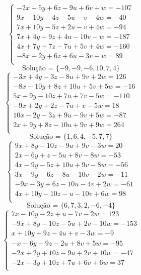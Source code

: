 \documentclass[12pt,oneside,a4paper]{article}
\begin{document}
\vspace{\baselineskip}
\begin{equation*}
\begin{cases}
-2x+5y+6z-9u+6v+w=-107 \\
9x-10y-4z-5u-v-4w=-40 \\
7x+10y-5z+2u-v+4w=-94 \\
7x+4y+9z+4u-10v-w=-187 \\
4x+7y+7z-7u+5v+4w=-160 \\
-8x-2y+6z+6u-3v-w=89 \\
\end{cases}
\end{equation*}
\begin{equation*}
\text{Solução = }\{-9,-9,-6,10,7,4\}
\end{equation*}
\vspace{\baselineskip}
\begin{equation*}
\begin{cases}
-3x+4y-3z-8u+9v+2w=126 \\
-8x-10y+8z+10u+5v+5w=-16 \\
5x-9y-10z+7u+7v-5w=-110 \\
-9x+2y+2z-7u+v-5w=18 \\
10x-2y-3z+9u-9v+5w=-87 \\
2x+9y+8z-10u+9v+9w=264 \\
\end{cases}
\end{equation*}
\begin{equation*}
\text{Solução = }\{1,6,4,-5,7,7\}
\end{equation*}
\vspace{\baselineskip}
\begin{equation*}
\begin{cases}
9x+8y-10z-9u+9v-3w=20 \\
2x-6y+z-5u+8v-8w=-53 \\
4x-9y-5z+10u+9v-8w=-56 \\
3x-9y-6z-8u-10v-2w=-11 \\
-9x-3y+6z-10u-4v+2w=-61 \\
4x+10y-10z-u-10v+6w=98 \\
\end{cases}
\end{equation*}
\begin{equation*}
\text{Solução = }\{6,7,3,2,-6,-4\}
\end{equation*}
\vspace{\baselineskip}
\begin{equation*}
\begin{cases}
7x-10y-2z+u-7v-2w=123 \\
-9x+8y-10z-5u+2v-10w=-153 \\
x+10y+9z-4u+v-3w=-9 \\
-x-6y-9z-2u+8v+5w=-95 \\
-2x+2y+10z-9u+2v+10w=-47 \\
-2x-3y+10z+7u+6v+6w=37 \\
\end{cases}
\end{equation*}
\end{document}
